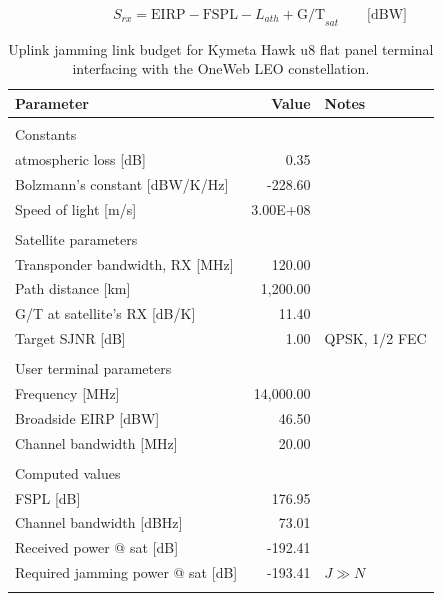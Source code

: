 \documentclass[english, 12pt, a4paper, elec, utf8, a-1b, online]{aaltothesis}
\begin{document}
\begin{equation} \label{eq-signal-power-simplified}
  S_{rx} = \mathrm{EIRP} - \mathrm{FSPL} - L_{ath} + \mathrm{G/T}_{sat} \qquad \text{[dBW]}
\end{equation}

\begin{table}[h]
  \centering
  \caption{Uplink jamming link budget for Kymeta Hawk u8 flat panel terminal interfacing with the OneWeb LEO constellation.}
  \begin{tabular}{@{}lrl@{}}
    \toprule
    Parameter                             & Value     & Notes         \\ \midrule
                                          &           &               \\
    Constants                             &           &               \\ 
    atmospheric loss {[}dB{]}            & 0.35      &               \\
    Bolzmann’s constant {[}dBW/K/Hz{]}    & -228.60   &               \\
    Speed of light {[}m/s{]}              & 3.00E+08  &               \\
                                          &           &               \\
    Satellite parameters                  &           &               \\ 
    Transponder bandwidth, RX {[}MHz{]}   & 120.00    &               \\
    Path distance {[}km{]}                & 1,200.00  &               \\
    G/T at satellite’s RX {[}dB/K{]}      & 11.40     &               \\
    Target SJNR {[}dB{]}                  & 1.00      & QPSK, 1/2 FEC \\
                                          &           &               \\
    User terminal parameters              &           &               \\ 
    Frequency {[}MHz{]}                   & 14,000.00 &               \\
    Broadside EIRP {[}dBW{]}              & 46.50     &               \\
    Channel bandwidth {[}MHz{]}           & 20.00     &               \\
                                          &           &               \\
    Computed values                       &           &               \\
    FSPL {[}dB{]}                         & 176.95    &               \\
    Channel bandwidth {[}dBHz{]}          & 73.01     &               \\
    Received power @ sat {[}dB{]}         & -192.41   &               \\
    Required jamming power @ sat {[}dB{]} & -193.41   & $J \gg N$     \\ \bottomrule
    \label{table-ul-jamming-link-budget}
  \end{tabular}
\end{table}
\end{document}
